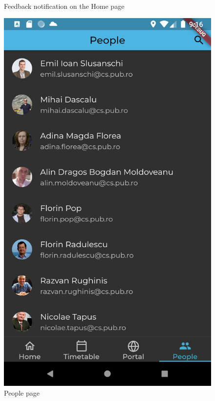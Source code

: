\begin{figure}[!ht]
\begin{minipage}[t]{0.315\textwidth}
            \caption{Feedback notification on the Home page}
            \label{4:fig:feedback_nudge}
        \end{minipage}
        \hfill
        \begin{minipage}[t]{0.315\textwidth}
            \captionsetup{justification=centering}
            \includegraphics[width=\textwidth]{figures/app/final/people_page.png}
            \caption{People page}
            \label{4:fig:people_page}
        \end{minipage}

\end{figure}
